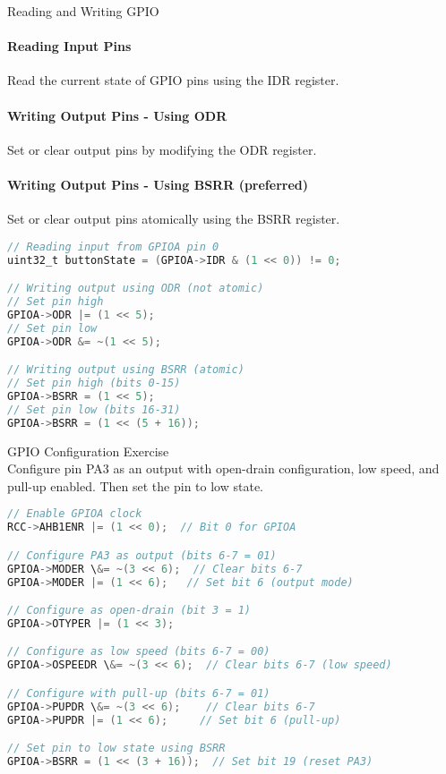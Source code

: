 \begin{KR}{Reading and Writing GPIO}
\paragraph{Reading Input Pins}
Read the current state of GPIO pins using the IDR register.
\paragraph{Writing Output Pins - Using ODR}
Set or clear output pins by modifying the ODR register.
\paragraph{Writing Output Pins - Using BSRR (preferred)}
Set or clear output pins atomically using the BSRR register.

\begin{lstlisting}[language=C, style=basesmol] 
// Reading input from GPIOA pin 0
uint32_t buttonState = (GPIOA->IDR & (1 << 0)) != 0;

// Writing output using ODR (not atomic)
// Set pin high
GPIOA->ODR |= (1 << 5);
// Set pin low
GPIOA->ODR &= ~(1 << 5);

// Writing output using BSRR (atomic)
// Set pin high (bits 0-15)
GPIOA->BSRR = (1 << 5);
// Set pin low (bits 16-31)
GPIOA->BSRR = (1 << (5 + 16));
\end{lstlisting}
\end{KR}

\begin{example2}{GPIO Configuration Exercise}\\
Configure pin PA3 as an output with open-drain configuration, low speed, and pull-up enabled. Then set the pin to low state.
\begin{lstlisting}[language=C, style=basesmol] 
// Enable GPIOA clock
RCC->AHB1ENR |= (1 << 0);  // Bit 0 for GPIOA

// Configure PA3 as output (bits 6-7 = 01)
GPIOA->MODER \&= ~(3 << 6);  // Clear bits 6-7
GPIOA->MODER |= (1 << 6);   // Set bit 6 (output mode)

// Configure as open-drain (bit 3 = 1)
GPIOA->OTYPER |= (1 << 3);  

// Configure as low speed (bits 6-7 = 00)
GPIOA->OSPEEDR \&= ~(3 << 6);  // Clear bits 6-7 (low speed)

// Configure with pull-up (bits 6-7 = 01)
GPIOA->PUPDR \&= ~(3 << 6);    // Clear bits 6-7
GPIOA->PUPDR |= (1 << 6);     // Set bit 6 (pull-up)

// Set pin to low state using BSRR
GPIOA->BSRR = (1 << (3 + 16));  // Set bit 19 (reset PA3)
\end{lstlisting}
\end{example2}

